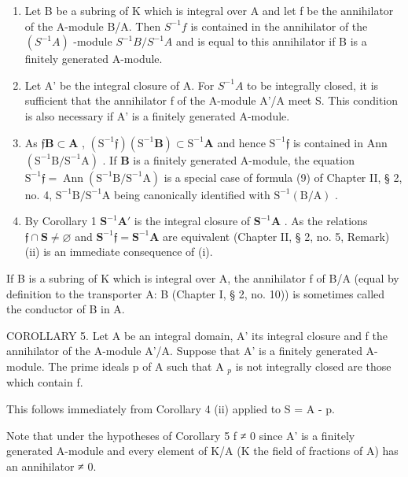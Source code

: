 \begin{enumerate}
\def\labelenumi{(\roman{enumi})}
\item
  Let B be a subring of K which is integral over A and let f be the annihilator of the A-module B/A. Then \(S^{-1}f\) is contained in the annihilator of the \((S^{-1}A)\) -module \(S^{-1}B/S^{-1}A\) and is equal to this annihilator if B is a finitely generated A-module.
\item
  Let A' be the integral closure of A. For \(S^{-1}A\) to be integrally closed, it is sufficient that the annihilator f of the A-module A'/A meet S. This condition is also necessary if A' is a finitely generated A-module.
\setcounter{enumi}{0}
\item
  As \(\mathfrak{f}\mathbf{B} \subset \mathbf{A}\) , \((\mathrm{S}^{-1}\mathfrak{f})(\mathrm{S}^{-1}\mathbf{B}) \subset \mathrm{S}^{-1}\mathbf{A}\) and hence \(\mathrm{S}^{-1}\mathfrak{f}\) is contained in Ann \((\mathrm{S}^{-1}\mathrm{B} / \mathrm{S}^{-1}\mathrm{A})\) . If \(\mathbf{B}\) is a finitely generated A-module, the equation \(\mathrm{S}^{-1}\mathfrak{f} = \operatorname{Ann}(\mathrm{S}^{-1}\mathrm{B} / \mathrm{S}^{-1}\mathrm{A})\) is a special case of formula (9) of Chapter II, § 2, no. 4, \(\mathrm{S}^{-1}\mathrm{B} / \mathrm{S}^{-1}\mathrm{A}\) being canonically identified with \(\mathrm{S}^{-1}(\mathrm{B} / \mathrm{A})\) .
\item
  By Corollary 1 \(\mathbf{S}^{-1}\mathbf{A}'\) is the integral closure of \(\mathbf{S}^{-1}\mathbf{A}\) . As the relations \(\mathfrak{f} \cap \mathbf{S} \neq \varnothing\) and \(\mathbf{S}^{-1}\mathfrak{f} = \mathbf{S}^{-1}\mathbf{A}\) are equivalent (Chapter II, § 2, no. 5, Remark) (ii) is an immediate consequence of (i).
\end{enumerate}

If B is a subring of K which is integral over A, the annihilator f of B/A (equal by definition to the transporter A: B (Chapter I, § 2, no. 10)) is sometimes called the conductor of B in A.

COROLLARY 5. Let A be an integral domain, A' its integral closure and f the annihilator of the A-module A'/A. Suppose that A' is a finitely generated A-module. The prime ideals p of A such that A \(_{p}\) is not integrally closed are those which contain f.

This follows immediately from Corollary 4 (ii) applied to S = A - p.

Note that under the hypotheses of Corollary 5 f ≠ 0 since A' is a finitely generated A-module and every element of K/A (K the field of fractions of A) has an annihilator ≠ 0.

